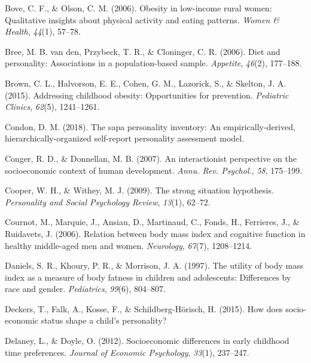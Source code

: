 \documentclass[man]{apa6}
\begin{document}
\leavevmode\hypertarget{ref-bove2006obesity}{}%
Bove, C. F., \& Olson, C. M. (2006). Obesity in low-income rural women: Qualitative insights about physical activity and eating patterns. \emph{Women \& Health}, \emph{44}(1), 57--78.

\leavevmode\hypertarget{ref-van2006diet}{}%
Bree, M. B. van den, Przybeck, T. R., \& Cloninger, C. R. (2006). Diet and personality: Associations in a population-based sample. \emph{Appetite}, \emph{46}(2), 177--188.

\leavevmode\hypertarget{ref-brown2015addressing}{}%
Brown, C. L., Halvorson, E. E., Cohen, G. M., Lazorick, S., \& Skelton, J. A. (2015). Addressing childhood obesity: Opportunities for prevention. \emph{Pediatric Clinics}, \emph{62}(5), 1241--1261.

\leavevmode\hypertarget{ref-condon2018sapa}{}%
Condon, D. M. (2018). The sapa personality inventory: An empirically-derived, hierarchically-organized self-report personality assessment model.

\leavevmode\hypertarget{ref-conger2007interactionist}{}%
Conger, R. D., \& Donnellan, M. B. (2007). An interactionist perspective on the socioeconomic context of human development. \emph{Annu. Rev. Psychol.}, \emph{58}, 175--199.

\leavevmode\hypertarget{ref-cooper2009strong}{}%
Cooper, W. H., \& Withey, M. J. (2009). The strong situation hypothesis. \emph{Personality and Social Psychology Review}, \emph{13}(1), 62--72.

\leavevmode\hypertarget{ref-cournot2006relation}{}%
Cournot, M., Marquie, J., Ansiau, D., Martinaud, C., Fonds, H., Ferrieres, J., \& Ruidavets, J. (2006). Relation between body mass index and cognitive function in healthy middle-aged men and women. \emph{Neurology}, \emph{67}(7), 1208--1214.

\leavevmode\hypertarget{ref-daniels1997utility}{}%
Daniels, S. R., Khoury, P. R., \& Morrison, J. A. (1997). The utility of body mass index as a measure of body fatness in children and adolescents: Differences by race and gender. \emph{Pediatrics}, \emph{99}(6), 804--807.

\leavevmode\hypertarget{ref-deckers2015does}{}%
Deckers, T., Falk, A., Kosse, F., \& Schildberg-Hörisch, H. (2015). How does socio-economic status shape a child's personality?

\leavevmode\hypertarget{ref-delaney2012socioeconomic}{}%
Delaney, L., \& Doyle, O. (2012). Socioeconomic differences in early childhood time preferences. \emph{Journal of Economic Psychology}, \emph{33}(1), 237--247.
\end{document}
